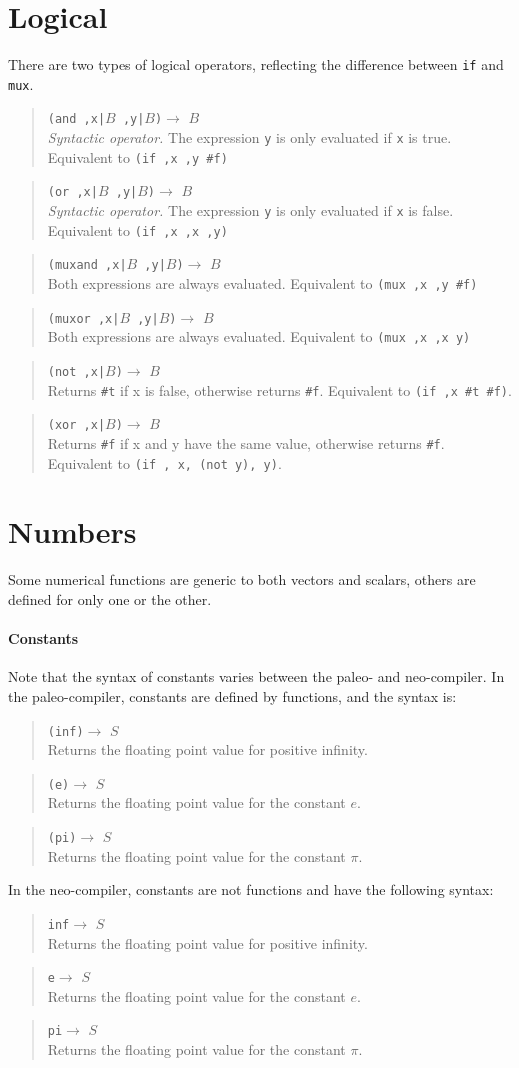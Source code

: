 \documentclass{article}
\newcommand\function[3]
{\begin{quote}{\tt #1}$\rightarrow$ \type{#2} \\ #3 \end{quote}}
\newcommand\syntactic[3]
{\function{#1}{#2}{{\em Syntactic operator.} #3}}
\newcommand\type[1]{$#1$}
\newcommand\var[1]{{\tt #1}}
\begin{document}
\section{Logical}

There are two types of logical operators, reflecting the difference
between \var{if} and \var{mux}.

\syntactic{(and ,x|\type{B} ,y|\type{B})}{B}{The expression \var{y} is only 
  evaluated if \var{x} is true.  Equivalent to \var{(if ,x ,y \#f)}}
\syntactic{(or ,x|\type{B} ,y|\type{B})}{B}{The expression \var{y} is only 
  evaluated if \var{x} is false.  Equivalent to \var{(if ,x ,x ,y)}}
\function{(muxand ,x|\type{B} ,y|\type{B})}{B}{Both expressions are always
  evaluated.  Equivalent to \var{(mux ,x ,y \#f)}}
\function{(muxor ,x|\type{B} ,y|\type{B})}{B}{Both expressions are always
  evaluated.  Equivalent to \var{(mux ,x ,x y)}}

\function{(not ,x|\type{B})}{B}{Returns \var{\#t} if x is false, otherwise
  returns \var{\#f}.  Equivalent to \var{(if ,x \#t \#f)}.}
\function{(xor ,x|\type{B})}{B}{Returns \var{\#f} if x and y have the same value, otherwise
  returns \var{\#f}.  Equivalent to \var{(if , x, (not y), y)}.}
  

\section{Numbers}

Some numerical functions are generic to both vectors and scalars,
others are defined for only one or the other.

\paragraph{Constants}
Note that the syntax of constants varies between the paleo- and
neo-compiler.  In the paleo-compiler, constants are defined by functions,
and the syntax is:
\function{(inf)}{S}{Returns the floating point value for positive infinity.}
\function{(e)}{S}{Returns the floating point value for the constant $e$.}
\function{(pi)}{S}{Returns the floating point value for the constant $\pi$.}

In the neo-compiler, constants are not functions and have the following
syntax:
\function{inf}{S}{Returns the floating point value for positive infinity.}
\function{e}{S}{Returns the floating point value for the constant $e$.}
\function{pi}{S}{Returns the floating point value for the constant $\pi$.}
\end{document}
